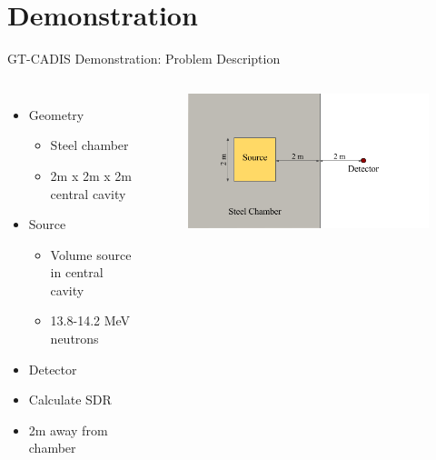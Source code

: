\documentclass{beamer}
\begin{document}
\section{Demonstration}
\begin{frame}{GT-CADIS Demonstration: Problem Description}
	\begin{columns}
           \begin{itemize}
		   \item{Geometry}
			   \begin{itemize}
				   \item{Steel chamber}
				   \item{2m x 2m x 2m central cavity}
			   \end{itemize}
		   \item{Source}
			   \begin{itemize}
				   \item{Volume source in central cavity}
				   \item{13.8-14.2 MeV neutrons}
			   \end{itemize}
		   \item{Detector}
			   \item{Calculate SDR}
			   \item{2m away from chamber}
	   \end{itemize}
		\begin{figure}
		\centering
		\includegraphics[scale=0.40]{orig_geom_pres.png}
                \end{figure}
	\end{columns}
\end{frame}
\end{document}
